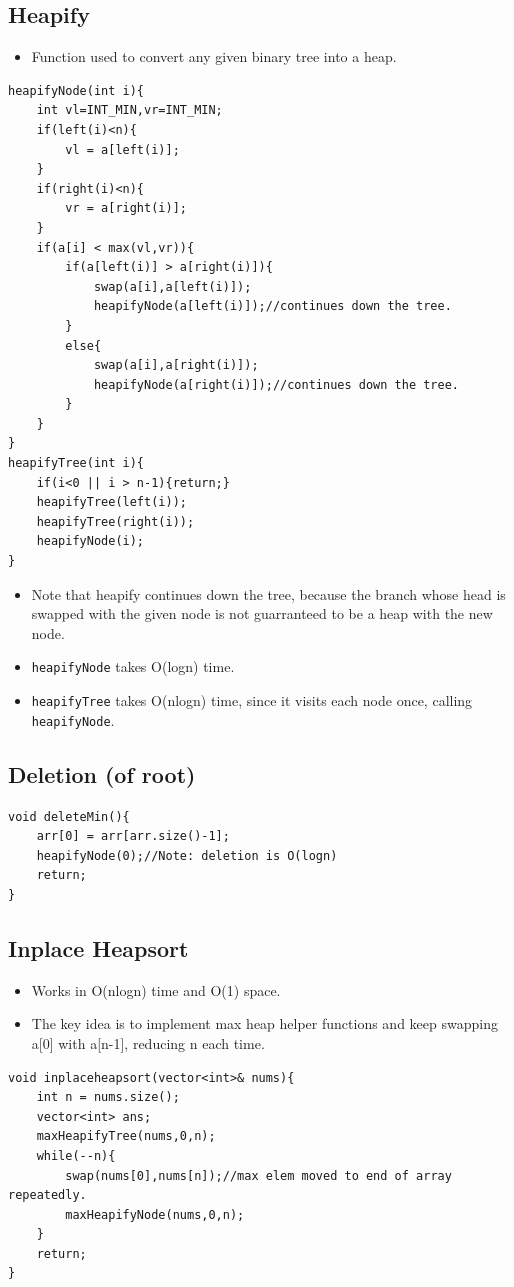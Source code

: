 \documentclass{report}
\begin{document}
\subsection{Heapify}
\begin{itemize}
\item Function used to convert any given binary tree into a heap.
\end{itemize}
\begin{lstlisting}
heapifyNode(int i){
    int vl=INT_MIN,vr=INT_MIN;
    if(left(i)<n){
        vl = a[left(i)];
    }
    if(right(i)<n){
        vr = a[right(i)];
    }
    if(a[i] < max(vl,vr)){
        if(a[left(i)] > a[right(i)]){
            swap(a[i],a[left(i)]);
            heapifyNode(a[left(i)]);//continues down the tree.
        }
        else{
            swap(a[i],a[right(i)]);
            heapifyNode(a[right(i)]);//continues down the tree.
        }
    }
}
heapifyTree(int i){
    if(i<0 || i > n-1){return;}
    heapifyTree(left(i));
    heapifyTree(right(i));
    heapifyNode(i);
}
\end{lstlisting}
\begin{itemize}
\item Note that heapify continues down the tree, because the branch whose head is swapped with the given node is not guarranteed to be a heap with the new node.
\item \texttt{heapifyNode} takes O(logn) time.
\item \texttt{heapifyTree} takes O(nlogn) time, since it visits each node once, calling \texttt{heapifyNode}.
\end{itemize}
\subsection{Deletion (of root)}
\begin{lstlisting}
void deleteMin(){
    arr[0] = arr[arr.size()-1];
    heapifyNode(0);//Note: deletion is O(logn)
    return;
}
\end{lstlisting}

\subsection{Inplace Heapsort}
\begin{itemize}
\item Works in O(nlogn) time and O(1) space.
\item The key idea is to implement max heap helper functions and keep swapping a[0] with a[n-1], reducing n each time.
\end{itemize}
\begin{lstlisting}
void inplaceheapsort(vector<int>& nums){
    int n = nums.size();
    vector<int> ans;
    maxHeapifyTree(nums,0,n);
    while(--n){
        swap(nums[0],nums[n]);//max elem moved to end of array repeatedly.
        maxHeapifyNode(nums,0,n);
    }
    return;
}
\end{lstlisting}
\end{document}
